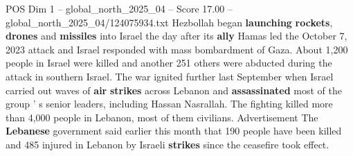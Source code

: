 \begin{textsample}{POS Dim 1 – global\_north\_2025\_04 – Score 17.00 – global\_north\_2025\_04/124075934.txt}
Hezbollah began \textbf{launching} \textbf{rockets}, \textbf{drones} and \textbf{missiles} into Israel the day after its \textbf{ally} Hamas led the October 7, 2023 attack and Israel responded with mass bombardment of Gaza.
About 1,200 people in Israel were killed and another 251 others were abducted during the attack in southern Israel.
The war ignited further last September when Israel carried out waves of \textbf{air} \textbf{strikes} across Lebanon and \textbf{assassinated} most of the group ' s senior leaders, including Hassan Nasrallah.
The fighting killed more than 4,000 people in Lebanon, most of them civilians.
Advertisement The \textbf{Lebanese} government said earlier this month that 190 people have been killed and 485 injured in Lebanon by Israeli \textbf{strikes} since the ceasefire took effect.

\end{textsample}
